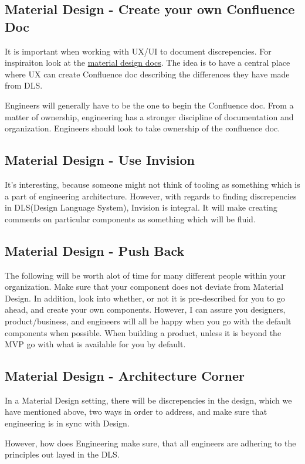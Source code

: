 \subsection{ Material Design - Create your own Confluence Doc }

It is important when working with UX/UI to document discrepencies. For
inspiraiton look at the \href{https://material.io/guidelines/components/sliders.html}{material design docs}.
The idea is to have a central place where UX can create Confluence doc
describing the differences they have made from DLS.

Engineers will generally have to be the one to begin the Confluence doc. From a
matter of ownership, engineering has a stronger discipline of documentation and
organization. Engineers should look to take ownership of the confluence doc.

\subsection{ Material Design - Use Invision }
It's interesting, because someone might not think of tooling as something which
is a part of engineering architecture. However, with regards to finding
discrepencies in DLS(Design Language System), Invision is integral. It will
make creating comments on particular components as something which will be fluid.

\subsection{ Material Design - Push Back }
The following will be worth alot of time for many different people within your
organization. Make sure that your component does not deviate from Material
Design. In addition, look into whether, or not it is pre-described for you to
go ahead, and create your own components. However, I can assure you designers,
product/business, and engineers will all be happy when you go with the default
components when possible. When building a product, unless it is beyond the MVP
go with what is available for you by default.

\subsection{ Material Design - Architecture Corner }
In a Material Design setting, there will be discrepencies in the design, which
we have mentioned above, two ways in order to address, and make sure that
engineering is in sync with Design.

However, how does Engineering make sure, that all engineers are adhering to the
principles out layed in the DLS.
